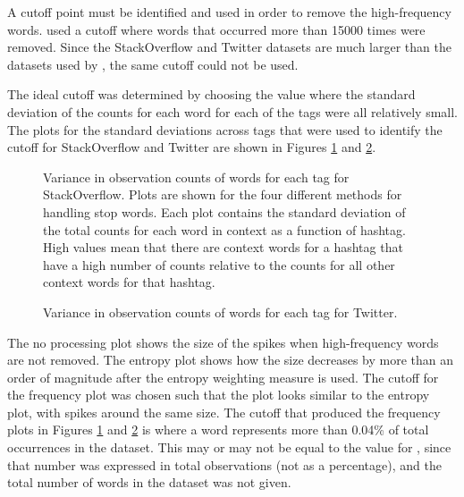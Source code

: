 \documentclass[man,donotrepeattitle]{apa6}
\begin{document}
A cutoff point must be identified and used in order to remove the high-frequency words.
\textcite{Sahlgren2008} used a cutoff where words that occurred more than \num{15000} times were removed.
Since the StackOverflow and Twitter datasets are much larger than the datasets used by \citeauthor{Sahlgren2008}, the same cutoff could not be used.

The ideal cutoff was determined by choosing the value where the standard deviation of the counts for each word for each of the tags were all relatively small.
The plots for the standard deviations across tags that were used to identify the cutoff for StackOverflow and Twitter are shown in Figures \ref{figContextCutoffSO} and \ref{figContextCutoffT}.

\begin{figure}[!htbp]
  \caption{
    Variance in observation counts of words for each tag for StackOverflow.
    Plots are shown for the four different methods for handling stop words.
    Each plot contains the standard deviation of the total counts for each word in context as a function of hashtag.
    High values mean that there are context words for a hashtag that have a high number of counts relative to the counts for all other context words for that hashtag.
  }
  \label{figContextCutoffSO}
\end{figure}

\begin{figure}[!htbp]
  \caption{
    Variance in observation counts of words for each tag for Twitter.
  }
  \label{figContextCutoffT}
\end{figure}

The no processing plot shows the size of the spikes when high-frequency words are not removed.
The entropy plot shows how the size decreases by more than an order of magnitude after the entropy weighting measure is used.
The cutoff for the frequency plot was chosen such that the plot looks similar to the entropy plot, with spikes around the same size.
The cutoff that produced the frequency plots in Figures \ref{figContextCutoffSO} and \ref{figContextCutoffT} is where a word represents more than \num{.04}\% of total occurrences in the dataset.
This may or may not be equal to the value for \textcite{Sahlgren2008}, since that number was expressed in total observations (not as a percentage), and the total number of words in the dataset was not given.
\end{document}
